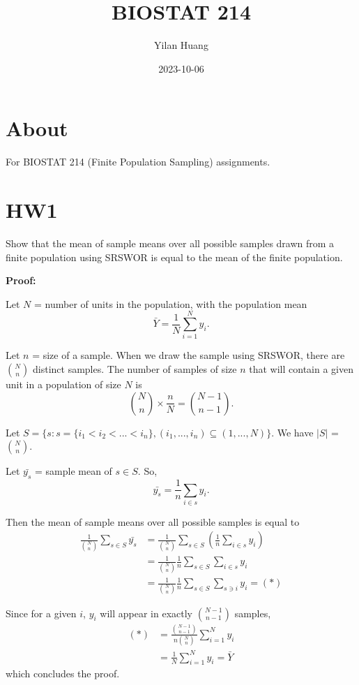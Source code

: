 \documentclass[
]{book}
\title{BIOSTAT 214}
\author{Yilan Huang}
\date{2023-10-06}
\begin{document}
\maketitle

{
\setcounter{tocdepth}{1}
\tableofcontents
}
\hypertarget{about}{%
\chapter{About}\label{about}}

For BIOSTAT 214 (Finite Population Sampling) assignments.

\hypertarget{hw1}{%
\chapter{HW1}\label{hw1}}

Show that the mean of sample means over all possible samples drawn from a finite population using SRSWOR is equal to the mean of the finite population.

\textbf{Proof:}

Let \(N\) = number of units in the population, with the population mean
\[
\bar{Y} = \frac{1}{N} \sum_{i=1}^N y_i. 
\]

Let \(n\) = size of a sample. When we draw the sample using SRSWOR, there are \(N \choose n\) distinct samples. The number of samples of size \(n\) that will contain a given unit in a population of size \(N\) is
\[
{N \choose n} \times \frac{n}{N} = {N-1 \choose n-1}.
\]

Let \(S = \{s: s = \{i_1 < i_2 < ... < i_n\}, (i_1, ..., i_n) \subseteq (1, ..., N)\}\). We have \(|S|\) = \(N \choose n\).

Let \(\bar{y_s}\) = sample mean of \(s \in S\). So,
\[
\bar{y_s} = \frac{1}{n} \sum_{i \in s} y_i.
\]

Then the mean of sample means over all possible samples is equal to
\begin{align}
\frac{1}{{N \choose n}} \sum_{s \in S} \bar{y_s} &= \frac{1}{{N \choose n}} \sum_{s \in S} (\frac{1}{n} \sum_{i \in s} y_i) \\
&= \frac{1}{{N \choose n}} \frac{1}{n} \sum_{s \in S} \sum_{i \in s} y_i \\
&= \frac{1}{{N \choose n}} \frac{1}{n} \sum_{s \in S} \sum_{s \ni i} y_i = (*) 
\end{align}

Since for a given \(i\), \(y_i\) will appear in exactly \({N-1 \choose n-1}\) samples,
\begin{align} 
(*) &= \frac{{N-1 \choose n-1}}{n{N \choose n}} \sum_{i=1}^N y_i \\
&= \frac{1}{N} \sum_{i=1}^N y_i = \bar{Y} 
\end{align}
which concludes the proof.

  
\end{document}
